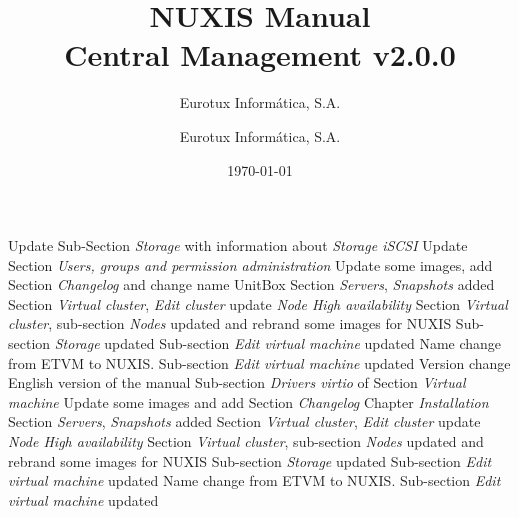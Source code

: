 \documentclass[12pt,a4paper,english]{scrreprt}
\author{Eurotux Informática, S.A.}
\title{NUXIS Manual\\Central Management v2.0.0}
\subtitle{Eurotux Informática, S.A.}
\date{\today}
\begin{document}
\maketitle

\begin{Log}
Update Sub-Section \textit{Storage} with information about \emph{Storage iSCSI}
Update Section \textit{Users, groups and permission administration}
Update some images, add Section \textit{Changelog} and change name UnitBox
Section \textit{Servers}, \textit{Snapshots} added
Section \textit{Virtual cluster}, \textit{Edit cluster} update \textit{Node High availability}
Section \textit{Virtual cluster}, sub-section \textit{Nodes} updated and rebrand some images for NUXIS
Sub-section \textit{Storage} updated 
Sub-section \textit{Edit virtual machine} updated 
Name change from ETVM to NUXIS. Sub-section \textit{Edit virtual machine} updated 
Version change
English version of the manual
Sub-section \textit{Drivers virtio} of Section \textit{Virtual machine}
Update some images and add Section \textit{Changelog}
Chapter \textit{Installation}
Section \textit{Servers}, \textit{Snapshots} added
Section \textit{Virtual cluster}, \textit{Edit cluster} update \textit{Node High availability}
Section \textit{Virtual cluster}, sub-section \textit{Nodes} updated and rebrand some images for NUXIS
Sub-section \textit{Storage} updated 
Sub-section \textit{Edit virtual machine} updated 
Name change from ETVM to NUXIS. Sub-section \textit{Edit virtual machine} updated 

\end{Log}
\end{document}
